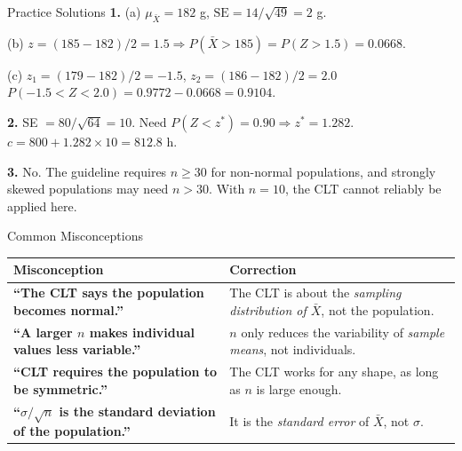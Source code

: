\documentclass[aspectratio=169]{beamer}
\begin{document}
\begin{frame}{Practice Solutions}
    \textbf{1.}
    (a) $\mu_{\bar{X}} = 182$ g, $\text{SE} = 14/\sqrt{49} = 2$ g.\medskip

    (b) $z = (185-182)/2 = 1.5 \Rightarrow P(\bar{X}>185) = P(Z>1.5) = 0.0668$.\medskip

    (c) $z_1 = (179-182)/2 = -1.5$, $z_2 = (186-182)/2 = 2.0$\\
    $P(-1.5 < Z < 2.0) = 0.9772 - 0.0668 = 0.9104$.
    \bigskip

    \textbf{2.} SE $= 80/\sqrt{64} = 10$.  Need $P(Z < z^*) = 0.90 \Rightarrow z^* = 1.282$.\\
    $c = 800 + 1.282 \times 10 = \mathbf{812.8}$ h.
    \bigskip

    \textbf{3.} No.  The guideline requires $n \geq 30$ for non-normal populations,
    and strongly skewed populations may need $n > 30$.  With $n = 10$, the CLT
    cannot reliably be applied here.
\end{frame}

\begin{frame}{Common Misconceptions}
    \begin{tabular}{@{}>{\bfseries}p{} p{}@{}}
        \toprule
        Misconception                                                      & Correction     \\
        \midrule
        ``The CLT says the population becomes normal.''                    &
        The CLT is about the \emph{sampling distribution of $\bar{X}$}, not the population. \\[6pt]
        ``A larger $n$ makes individual values less variable.''            &
        $n$ only reduces the variability of \emph{sample means}, not individuals.           \\[6pt]
        ``CLT requires the population to be symmetric.''                   &
        The CLT works for any shape, as long as $n$ is large enough.                        \\[6pt]
        ``$\sigma/\sqrt{n}$ is the standard deviation of the population.'' &
        It is the \emph{standard error} of $\bar{X}$, not $\sigma$.                         \\
        \bottomrule
    \end{tabular}
\end{frame}
\end{document}
